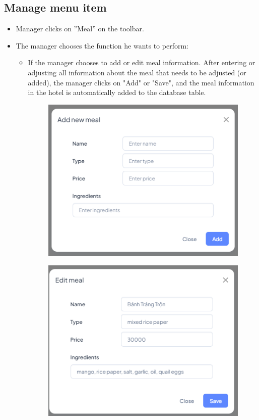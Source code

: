     \subsection{Manage menu item}
    \begin{itemize}
        \item Manager clicks on ”Meal” on the toolbar.
        \item The manager chooses the function he wants to perform:
        \begin{itemize}
            \item If the manager chooses to add or edit meal information. After entering or adjusting all information about the meal that needs to be adjusted (or added), the manager clicks on "Add" or "Save", and the meal information in the hotel is automatically added to the database table.
            \begin{figure}[H]
                \includegraphics[width=1\linewidth]{img/addmeal_menu.png}
                \label{fig:addmeal_menu}
            \end{figure}
            \begin{figure}[H]
                \includegraphics[width=1\linewidth]{img/editmeal.png}

\end{figure}
\end{itemize}
\end{itemize}
